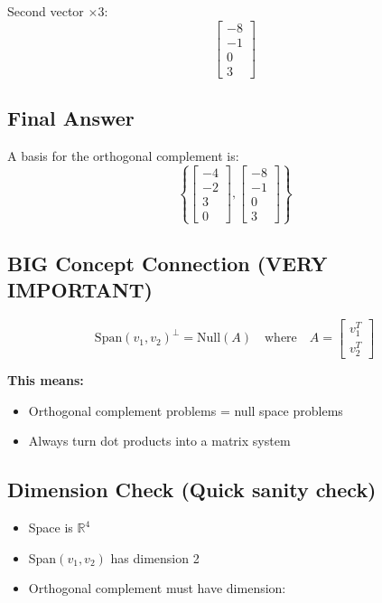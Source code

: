 \documentclass[11pt]{article}
\begin{document}
Second vector $\times 3$:
\[
\begin{bmatrix}
-8 \\ -1 \\ 0 \\ 3
\end{bmatrix}
\]

\subsection*{Final Answer}

A basis for the orthogonal complement is:
\[
\boxed{
\left\{
\begin{bmatrix}
-4 \\ -2 \\ 3 \\ 0
\end{bmatrix},
\begin{bmatrix}
-8 \\ -1 \\ 0 \\ 3
\end{bmatrix}
\right\}
}
\]

\hrulefill

\subsection*{BIG Concept Connection (VERY IMPORTANT)}

\[
\text{Span}(v_1, v_2)^\perp
=
\text{Null}(A)
\quad \text{where} \quad
A =
\begin{bmatrix}
v_1^T \\
v_2^T
\end{bmatrix}
\]

\textbf{This means:}
\begin{itemize}
    \item Orthogonal complement problems = null space problems
    \item Always turn dot products into a matrix system
\end{itemize}

\hrulefill

\subsection*{Dimension Check (Quick sanity check)}

\begin{itemize}
    \item Space is $\mathbb{R}^4$
    \item Span$(v_1,v_2)$ has dimension 2
    \item Orthogonal complement must have dimension:
\end{itemize}
\end{document}
